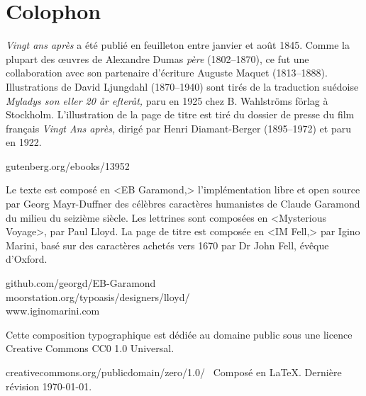 \documentclass[
paper=5.5in:8.5in,
]{scrbook}
\begin{document}
\chapter*{Colophon}

\centering

\vfill
\begin{minipage}{\textwidth}
\textit{Vingt ans après} a été publié en feuilleton entre janvier et août 1845. Comme la plupart des œuvres de Alexandre Dumas \textit{père} (1802--1870), ce fut une collaboration avec son partenaire d'écriture Auguste Maquet (1813--1888).
Illustrations de David Ljungdahl (1870--1940) sont tirés de la traduction suédoise \textit{	
Myladys son eller 20 år efteråt,} paru en 1925 chez B. Wahlströms förlag à Stockholm. L'illustration de la page de titre est tiré du dossier de presse du film français \textit{Vingt Ans après,} dirigé par Henri Diamant-Berger (1895--1972) et paru en 1922.
\end{minipage}
\vfill
gutenberg.org/ebooks/13952
\vfill
\divider
\vfill
\begin{minipage}{\textwidth}
Le texte est composé en <EB Garamond,> l'implémentation libre et open source par Georg Mayr-Duffner des célèbres caractères humanistes de Claude Garamond du milieu du seizième siècle. Les lettrines sont composées en <Mysterious Voyage>, par Paul Lloyd. La page de titre est composée en <IM Fell,> par Igino Marini, basé sur des caractères achetés vers 1670 par Dr John Fell, évêque d'Oxford.
\end{minipage}
\vfill
github.com/georgd/EB-Garamond\\moorstation.org/typoasis/designers/lloyd/\\www.iginomarini.com
\vfill
\divider
\vfill
\begin{minipage}{\textwidth}
Cette composition typographique est dédiée au domaine public sous une licence Creative Commons CC0 1.0 Universal. 
\end{minipage}
\vfill
creativecommons.org/publicdomain/zero/1.0/\
\vfill
\divider
\vfill
Composé en \LaTeX{}. Dernière révision \today.
\thispagestyle{empty}
\end{document}
